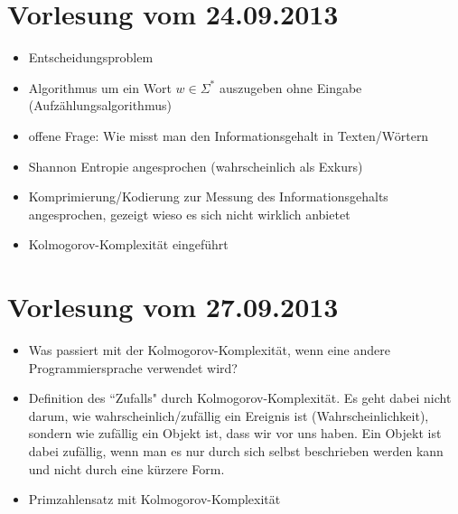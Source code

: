 \section{Vorlesung vom 24.09.2013}
\begin{itemize}
  \item Entscheidungsproblem
  \item Algorithmus um ein Wort $w \in \Sigma^*$ auszugeben ohne Eingabe (Aufzählungsalgorithmus)
  \item offene Frage: Wie misst man den Informationsgehalt in Texten/Wörtern
  \item Shannon Entropie angesprochen (wahrscheinlich als Exkurs)
  \item Komprimierung/Kodierung zur Messung des Informationsgehalts angesprochen, gezeigt wieso es sich nicht wirklich anbietet
  \item Kolmogorov-Komplexität eingeführt
\end{itemize}

\section{Vorlesung vom 27.09.2013}
\begin{itemize}
  \item Was passiert mit der Kolmogorov-Komplexität, wenn eine andere Programmiersprache verwendet wird?
  \item Definition des ``Zufalls" durch Kolmogorov-Komplexität. Es geht dabei nicht darum, wie wahrscheinlich/zufällig ein Ereignis ist (Wahrscheinlichkeit), sondern wie zufällig ein Objekt ist, dass wir vor uns haben. Ein Objekt ist dabei zufällig, wenn man es nur durch sich selbst beschrieben werden kann und nicht durch eine kürzere Form.
  \item Primzahlensatz mit Kolmogorov-Komplexität
\end{itemize}
